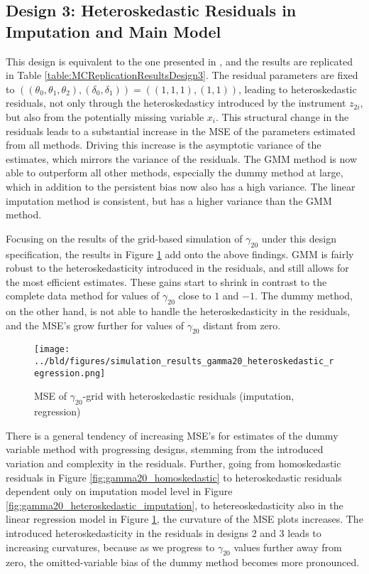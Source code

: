 \subsection{Design 3: Heteroskedastic Residuals in Imputation and Main Model}
This design is equivalent to the one presented in \citep{abrevaya2017}, and the results are replicated in Table \ref{table:MCReplicationResultsDesign3}.
The residual parameters are fixed to $((\theta_0, \theta_1, \theta_2), (\delta_0, \delta_1)) = ((1, 1, 1), (1, 1))$, leading to heteroskedastic residuals, not only through the heteroskedasticy introduced by the instrument $z_{2i}$, but also from the potentially missing variable $x_i$.
This structural change in the residuals leads to a substantial increase in the MSE of the parameters estimated from all methods.
Driving this increase is the asymptotic variance of the estimates, which mirrors the variance of the residuals.
The GMM method is now able to outperform all other methods, especially the dummy method at large, which in addition to the persistent bias now also has a high variance.
The linear imputation method is consistent, but has a higher variance than the GMM method.



Focusing on the results of the grid-based simulation of $\gamma_{20}$ under this design specification, the results in Figure \ref{fig:gamma20_heteroskedastic_regression} add onto the above findings.
GMM is fairly robust to the heteroskedasticity introduced in the residuals, and still allows for the most efficient estimates.
These gains start to shrink in contrast to the complete data method for values of $\gamma_{20}$ close to $1$ and $-1$.
The dummy method, on the other hand, is not able to handle the heteroskedasticity in the residuals, and the MSE's grow further for values of $\gamma_{20}$ distant from zero.

\begin{figure}[H]
    \centering
    \texttt{[image: ../bld/figures/simulation\_results\_gamma20\_heteroskedastic\_regression.png]}
    \caption{MSE of $\gamma_{20}$-grid with heteroskedastic residuals (imputation, regression)}
    \label{fig:gamma20_heteroskedastic_regression}
\end{figure}

There is a general tendency of increasing MSE's for estimates of the dummy variable method with progressing designs, stemming from the introduced variation and complexity in the residuals.
Further, going from homoskedastic residuals in Figure \ref{fig:gamma20_homoskedastic} to heteroskedastic residuals dependent only on imputation model level in Figure \ref{fig:gamma20_heteroskedastic_imputation}, to hetereoskedasticity also in the linear regression model in Figure \ref{fig:gamma20_heteroskedastic_regression}, the curvature of the MSE plots increases.
The introduced heteroskedasticity in the residuals in designs 2 and 3 leads to increasing curvatures, because as we progress to $\gamma_{20}$ values further away from zero, the omitted-variable bias of the dummy method becomes more pronounced.


